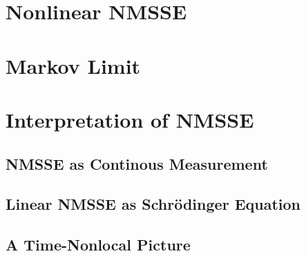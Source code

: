\section{Nonlinear NMSSE}
\label{sec:nmqsd.nonlin_nmsse}


\section{Markov Limit}
\label{sec:nmqsd.markov}


\section{Interpretation of NMSSE}
\label{sec:nmqsd.interpretation}


\subsection{NMSSE as Continous Measurement}
\label{sub:nmqsd.interpretation.measurement}

\subsection{Linear NMSSE as Schrödinger Equation}
\label{sub:nmqsd.interpretation.unitary_view}

\subsection{A Time-Nonlocal Picture}
\label{sub:nmqsd.interpretation.time_osci}


